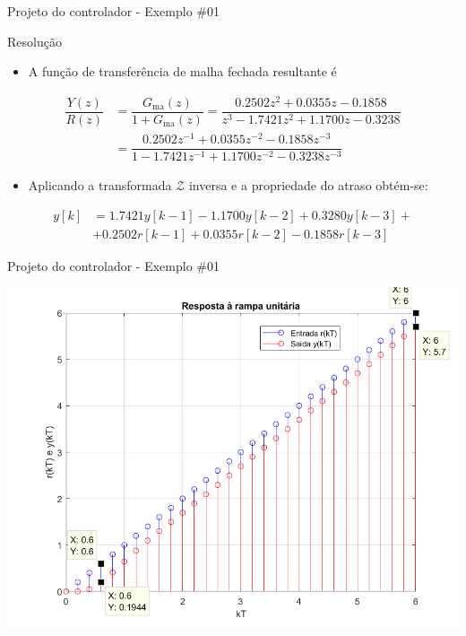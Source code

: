 \begin{frame}{Projeto do controlador - Exemplo \#01}
\begin{block}{Resolução}
\begin{itemize}
    \item A função de transferência de malha fechada resultante é
\end{itemize}
		\begin{align*}
         \dfrac{Y(z)}{R(z)}&= \dfrac{G_{\text{ma}}(z)}{1 + G_{\text{ma}}(z)} = \dfrac{\num{0,2502}z^2 + \num{0,0355}z - \num{0,1858}}{z^3 - \num{1,7421}z^2 + \num{1,1700}z - \num{0,3238}}\\ 
         &= \dfrac{\num{0,2502}z^{-1} + \num{0,0355}z^{-2} - \num{0,1858}z^{-3}}{1 - \num{1,7421}z^{-1} + \num{1,1700}z^{-2} - \num{0,3238}z^{-3}}
		\end{align*}
		\begin{itemize}
		    \item Aplicando a transformada $\mathcal{Z}$ inversa e a propriedade do atraso obtém-se:
		\end{itemize}
		\begin{align*}
         y[k]&= \num{1,7421} y[k-1] - \num{1,1700} y[k-2] + \num{0,3280} y[k-3] +\\ 
              &+ \num{0,2502} r[k-1] + \num{0,0355} r[k-2] - \num{0,1858} r[k-3]
		\end{align*}
    \end{block}
\end{frame}

\begin{frame}{Projeto do controlador - Exemplo \#01}
\centerline{\includegraphics[width=0.85\linewidth]{Figuras/Ch13/fig13.png}}
\end{frame}

